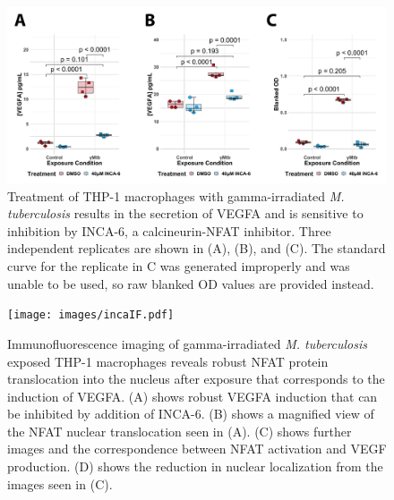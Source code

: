 \begin{figure}
\centering
\includegraphics[width=\textwidth]{images/incaelisa.pdf}
\caption{Treatment of THP-1 macrophages with gamma-irradiated \textit{M. tuberculosis} results in the secretion of VEGFA and is sensitive to inhibition by INCA-6, a calcineurin-NFAT inhibitor. Three independent replicates are shown in (A), (B), and (C). The standard curve for the replicate in C was generated improperly and was unable to be used, so raw blanked OD values are provided instead.}
\label{figure:elisa}

\end{figure}

\begin{figure}
\centering
\texttt{[image: images/incaIF.pdf]}
\caption{Immunofluorescence imaging of gamma-irradiated \textit{M. tuberculosis} exposed THP-1 macrophages reveals robust NFAT protein translocation into the nucleus after exposure that corresponds to the induction of VEGFA. (A) shows robust VEGFA induction that can be inhibited by addition of INCA-6. (B) shows a magnified view of the NFAT nuclear translocation seen in (A). (C) shows further images and the correspondence between NFAT activation and VEGF production. (D) shows the reduction in nuclear localization from the images seen in (C).}
\label{figure:incaif}

\end{figure}

